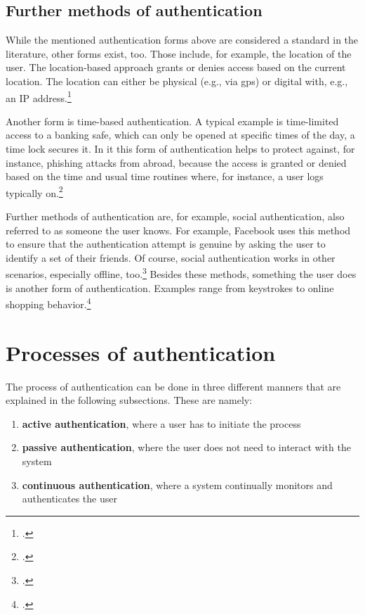 \subsection{Further methods of authentication}

While the mentioned authentication forms above are considered a standard in the literature, other forms exist, too. Those include, for example, the location of the user. The location-based approach grants or denies access based on the current location. The location can either be physical (e.g., via \gls{gps}) or digital with, e.g., an IP address.\footcites{6296127}[See][Chapter 13.9]{2308830}

Another form is time-based authentication. A typical example is time-limited access to a banking safe, which can only be opened at specific times of the day, a time lock secures it. In \gls{it} this form of authentication helps to protect against, for instance, phishing attacks from abroad, because the access is granted or denied based on the time and usual time routines where, for instance, a user logs typically on.\footcite[See][191]{dasgupta2017multi}

Further methods of authentication are, for example, social authentication, also referred to as \frqq someone the user knows\flqq. For example, Facebook uses this method to ensure that the authentication attempt is genuine by asking the user to identify a set of their friends. Of course, social authentication works in other scenarios, especially offline, too.\footcites[See][]{Brainard2006}[See][278--279]{shostack2014threat} Besides these methods, \frqq something the user does\flqq{} is another form of authentication. Examples range from keystrokes to online shopping behavior.\footcites[See][]{10.1007/978-3-642-18178-8_9}[See][]{7460349}

\section{Processes of authentication}

The process of authentication can be done in three different manners that are explained in the following subsections. These are namely:

\begin{enumerate}
	\item \textbf{active authentication}, where a user has to initiate the process
	\item \textbf{passive authentication}, where the user does not need to interact with the system
	\item \textbf{continuous authentication}, where a system continually monitors and authenticates the user
\end{enumerate}

